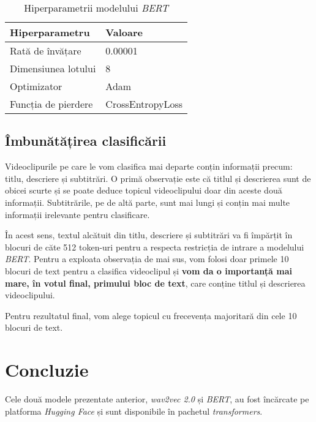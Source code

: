 \begin{table}[ht]
    \centering
    \begin{tabular}{@{}ll@{}}
        \toprule
        \textbf{Hiperparametru}   & \textbf{Valoare}         \\
        \midrule
        Rată de învățare             & 0.00001                  \\
        Dimensiunea lotului             & 8                        \\
        Optimizator                      & Adam                     \\
        Funcția de pierdere          & CrossEntropyLoss         \\
        \bottomrule
    \end{tabular}
    \caption{Hiperparametrii modelului \textit{BERT}}
    \label{tab:bert-hyperparameters}
\end{table}


\subsection{Îmbunătățirea clasificării}
Videoclipurile pe care le vom clasifica mai departe conțin informații precum: titlu, descriere și subtitrări.
O primă observație este că titlul și descrierea sunt de obicei scurte și se poate deduce topicul videoclipului
doar din aceste două informații. Subtitrările, pe de altă parte, sunt mai lungi și conțin mai multe informații 
irelevante pentru clasificare. 
\par
În acest sens, textul alcătuit din titlu, descriere și subtitrări va fi împărțit în blocuri de căte 512 token-uri
pentru a respecta restricția de intrare a modelului \textit{BERT}. Pentru a exploata observația de mai sus,
vom folosi doar primele 10 blocuri de text pentru a clasifica videoclipul și \textbf{vom da o importanță mai mare, în
votul final, primului bloc de text}, care conține titlul și descrierea videoclipului.
\par
Pentru rezultatul final, vom alege topicul cu frecevența majoritară din cele 10 blocuri de text.


\section{Concluzie}
Cele două modele prezentate anterior, \textit{wav2vec 2.0} și \textit{BERT}, au fost încărcate
pe platforma \textit{Hugging Face} și sunt disponibile în pachetul \textit{transformers}.

